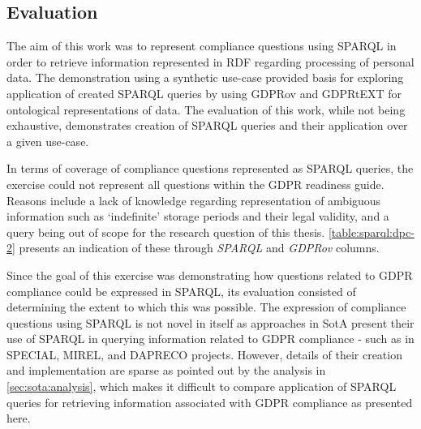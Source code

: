 \subsection{Evaluation}\label{sec:testing:sparql:evaluation}
The aim of this work was to represent compliance questions using SPARQL in order to retrieve information represented in RDF regarding processing of personal data.
The demonstration using a synthetic use-case provided basis for exploring application of created SPARQL queries by using GDPRov and GDPRtEXT for ontological representations of data.
The evaluation of this work, while not being exhaustive, demonstrates creation of SPARQL queries and their application over a given use-case.

In terms of coverage of compliance questions represented as SPARQL queries, the exercise could not represent all questions within the GDPR readiness guide.
Reasons include a lack of knowledge regarding representation of ambiguous information such as `indefinite' storage periods and their legal validity, and a query being out of scope for the research question of this thesis.
\autoref{table:sparql:dpc-2} presents an indication of these through \textit{SPARQL} and \textit{GDPRov} columns.

Since the goal of this exercise was demonstrating how questions related to GDPR compliance could be expressed in SPARQL, its evaluation consisted of determining the extent to which this was possible. 
The expression of compliance questions using SPARQL is not novel in itself as approaches in SotA present their use of SPARQL in querying information related to GDPR compliance - such as in SPECIAL, MIREL, and DAPRECO projects.
However, details of their creation and implementation are sparse as pointed out by the analysis in \autoref{sec:sota:analysis}, which makes it difficult to compare application of SPARQL queries for retrieving information associated with GDPR compliance as presented here.

